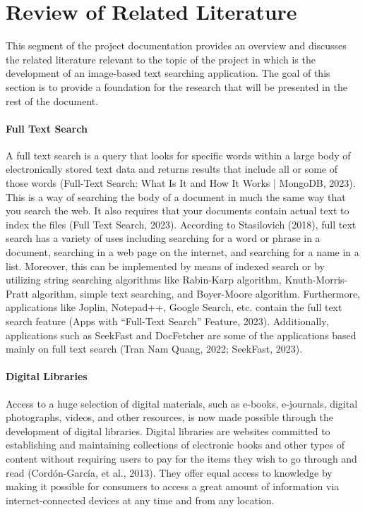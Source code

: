 \part{Review of Related Literature}

\hspace\parindent
This segment of the project documentation provides an overview and discusses the related literature
relevant to the topic of the project in which is the development of an image-based text searching
application. The goal of this section is to provide a foundation for the research that will be
presented in the rest of the document.


\subsection*{Full Text Search}
\hspace\parindent
A full text search is a query that looks for specific words within a large body of electronically
stored text data and returns results that include all or some of those words (Full-Text Search: What
Is It and How It Works | MongoDB, 2023). This is a way of searching the body of a document in much
the same way that you search the web. It also requires that your documents contain actual text to
index the files (Full Text Search, 2023). According to Stasilovich (2018), full text search has a
variety of uses including searching for a word or phrase in a document, searching in a web page on
the internet, and searching for a name in a list. Moreover, this can be implemented by means of
indexed search or by utilizing string searching algorithms like Rabin-Karp algorithm,
Knuth-Morris-Pratt algorithm, simple text searching, and Boyer-Moore algorithm. Furthermore,
applications like Joplin, Notepad++, Google Search, etc. contain the full text search feature (Apps
with “Full-Text Search” Feature, 2023). Additionally, applications such as SeekFast and DocFetcher
are some of the applications based mainly on full text search (Tran Nam Quang, 2022; SeekFast,
2023).

\subsection*{Digital Libraries}
\hspace\parindent
Access to a huge selection of digital materials, such as e-books, e-journals, digital photographs,
videos, and other resources, is now made possible through the development of digital libraries.
Digital libraries are websites committed to establishing and maintaining collections of electronic
books and other types of content without requiring users to pay for the items they wish to go
through and read (Cordón-García, et al., 2013). They offer equal access to knowledge by making it
possible for consumers to access a great amount of information via internet-connected devices at any
time and from any location.

